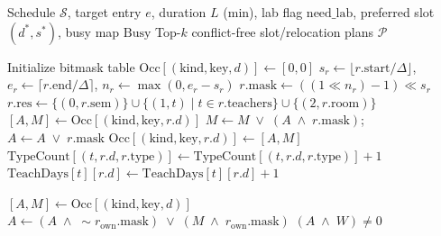 \documentclass[11pt,a4paper]{article}
\begin{document}
\begin{algorithm}[htbp]
\caption{Bitmask Occupancy Index \& Two-Tier Slot Suggestion Engine (\texttt{fast\_suggester.py})}
\label{alg:bitmask}
\begin{algorithmic}[1]
\Require Schedule $\mathcal{S}$, target entry $e$, duration $L$ (min), lab flag $\text{need\_lab}$, preferred slot $(d^*, s^*)$, busy map $\text{Busy}$
\Ensure Top-$k$ conflict-free slot/relocation plans $\mathcal{P}$

\vspace{0.4em}
\State Initialize bitmask table $\text{Occ}[(\text{kind}, \text{key}, d)] \gets [0, 0]$ 
    \State $s_r \gets \lfloor r.\text{start} / \Delta \rfloor$, \quad $e_r \gets \lceil r.\text{end} / \Delta \rceil$, \quad $n_r \gets \max(0, e_r - s_r)$
    \State $r.\text{mask} \gets ((1 \ll n_r) - 1) \ll s_r$ 
    \State $r.\text{res} \gets \{(0, r.\text{sem})\} \cup \{(1, t) \mid t \in r.\text{teachers}\} \cup \{(2, r.\text{room})\}$
        \State $[A, M] \gets \text{Occ}[(\text{kind}, \text{key}, r.d)]$
        \State $M \gets M \;\lor\; (A \;\land\; r.\text{mask})$; \quad $A \gets A \;\lor\; r.\text{mask}$
        \State $\text{Occ}[(\text{kind}, \text{key}, r.d)] \gets [A, M]$
    \EndFor
        \State $\text{TypeCount}[(t, r.d, r.\text{type})] \gets \text{TypeCount}[(t, r.d, r.\text{type})] + 1$
        \State $\text{TeachDays}[t][r.d] \gets \text{TeachDays}[t][r.d] + 1$
    \EndFor
\EndFor

\vspace{0.4em}
    \State $[A, M] \gets \text{Occ}[(\text{kind}, \text{key}, d)]$
        \State $A \gets (A \;\land\; \sim r_{\text{own}}.\text{mask}) \;\lor\; (M \;\land\; r_{\text{own}}.\text{mask})$ 
    \EndIf
    \State \Return $(A \;\land\; W) \neq 0$
\EndFunction


\end{algorithmic}
\end{algorithm}
\end{document}
